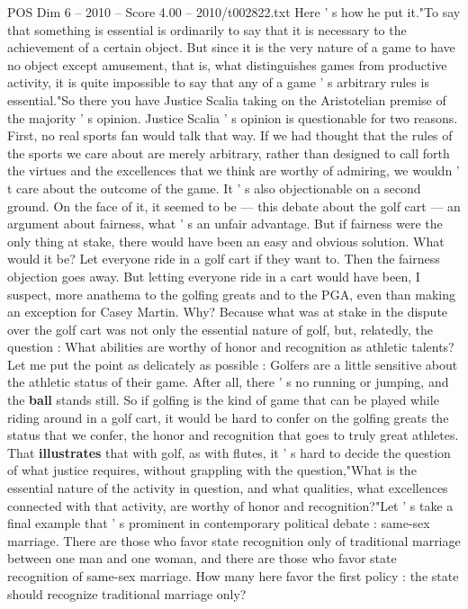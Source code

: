 \begin{textsample}{POS Dim 6 – 2010 – Score 4.00 – 2010/t002822.txt}
Here ' s how he put it."To say that something is essential is ordinarily to say that it is necessary to the achievement of a certain object.
But since it is the very nature of a game to have no object except amusement, that is, what distinguishes games from productive activity, it is quite impossible to say that any of a game ' s arbitrary rules is essential."So there you have Justice Scalia taking on the Aristotelian premise of the majority ' s opinion.
Justice Scalia ' s opinion is questionable for two reasons.
First, no real sports fan would talk that way.
If we had thought that the rules of the sports we care about are merely arbitrary, rather than designed to call forth the virtues and the excellences that we think are worthy of admiring, we wouldn ' t care about the outcome of the game.
It ' s also objectionable on a second ground.
On the face of it, it seemed to be — this debate about the golf cart — an argument about fairness, what ' s an unfair advantage.
But if fairness were the only thing at stake, there would have been an easy and obvious solution.
What would it be?
Let everyone ride in a golf cart if they want to.
Then the fairness objection goes away.
But letting everyone ride in a cart would have been, I suspect, more anathema to the golfing greats and to the PGA, even than making an exception for Casey Martin.
Why?
Because what was at stake in the dispute over the golf cart was not only the essential nature of golf, but, relatedly, the question : What abilities are worthy of honor and recognition as athletic talents?
Let me put the point as delicately as possible : Golfers are a little sensitive about the athletic status of their game.
After all, there ' s no running or jumping, and the \textbf{ball} stands still.
So if golfing is the kind of game that can be played while riding around in a golf cart, it would be hard to confer on the golfing greats the status that we confer, the honor and recognition that goes to truly great athletes.
That \textbf{illustrates} that with golf, as with flutes, it ' s hard to decide the question of what justice requires, without grappling with the question,"What is the essential nature of the activity in question, and what qualities, what excellences connected with that activity, are worthy of honor and recognition?"Let ' s take a final example that ' s prominent in contemporary political debate : same-sex marriage.
There are those who favor state recognition only of traditional marriage between one man and one woman, and there are those who favor state recognition of same-sex marriage.
How many here favor the first policy : the state should recognize traditional marriage only?

\end{textsample}
